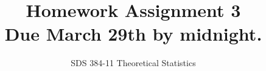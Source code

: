 \documentclass[11pt]{article}
\begin{document}
\title{{\bf Homework Assignment 3}\\Due March 29th by midnight.}
\author{SDS 384-11 Theoretical Statistics}

\date{}

\maketitle{}
\begin{enumerate}%



\end{enumerate}
\end{document}
